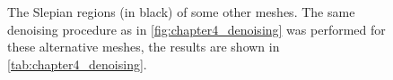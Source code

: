\begin{figure}[htp]
	\centering
	\hfill
	\hfill
	\newline
	\caption{
		The Slepian regions (in black) of some other meshes.
		The same denoising procedure as in \cref{fig:chapter4_denoising} was performed for these alternative meshes, the results are shown in \cref{tab:chapter4_denoising}.
	}\label{fig:chapter4_other_meshes}
\end{figure}
